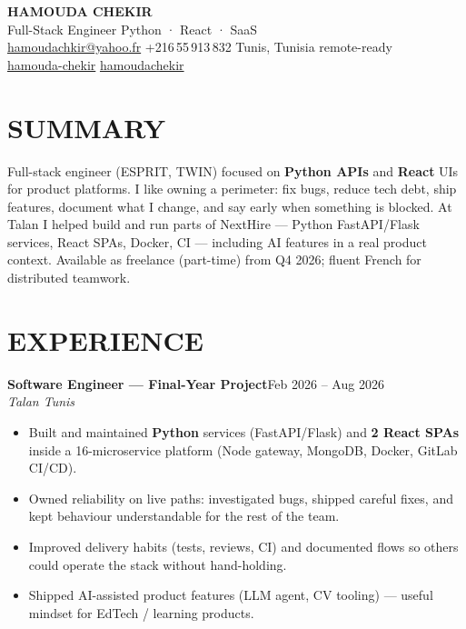 \documentclass[10pt,a4paper]{article}
\newcommand{\TargetTitle}{Full-Stack Engineer \textbar{} Python · React · SaaS}
\newcommand{\job}[3]{%
  \textbf{\color{primary}#1}\hfill{\color{muted}\small #2}\\[-1pt]
  {\color{accent}\textit{#3}}\\[2pt]
  \begin{itemize}[leftmargin=0.85em, itemsep=1pt, topsep=0pt, parsep=0pt, partopsep=0pt]
}
\newcommand{\contactsep}{\hspace{5pt}{\color{rulecolor}|}\hspace{5pt}}
\begin{document}
{\fontsize{22}{26}\selectfont\bfseries\color{primary}HAMOUDA CHEKIR}\\[2pt]
{\large\color{accent}\TargetTitle}\\[4pt]
{\footnotesize\color{muted}%
  \hspace{3pt}\href{mailto:hamoudachkir@yahoo.fr}{hamoudachkir@yahoo.fr}%
  \contactsep
  \hspace{3pt}+216\,55\,913\,832%
  \contactsep
  \hspace{3pt}Tunis, Tunisia \textbar{} remote-ready%
}\\[2pt]
{\footnotesize\color{muted}%
  \hspace{3pt}\href{https://www.linkedin.com/in/hamouda-chekir-5053572b4}{hamouda-chekir}%
  \contactsep
  \hspace{3pt}\href{https://github.com/hamoudachekir}{hamoudachekir}%
}\\[6pt]

\section{SUMMARY}
Full-stack engineer (ESPRIT, TWIN) focused on \textbf{Python APIs} and \textbf{React} UIs for product platforms.
I like owning a perimeter: fix bugs, reduce tech debt, ship features, document what I change, and say early when something is blocked.
At Talan I helped build and run parts of NextHire --- Python FastAPI/Flask services, React SPAs, Docker, CI --- including AI features in a real product context.
Available as freelance (part-time) from Q4 2026; fluent French for distributed teamwork.

\section{EXPERIENCE}

\job{Software Engineer --- Final-Year Project}{Feb 2026 -- Aug 2026}{Talan \textbar{} Tunis}
  \item Built and maintained \textbf{Python} services (FastAPI/Flask) and \textbf{2 React SPAs} inside a 16-microservice platform (Node gateway, MongoDB, Docker, GitLab CI/CD).
  \item Owned reliability on live paths: investigated bugs, shipped careful fixes, and kept behaviour understandable for the rest of the team.
  \item Improved delivery habits (tests, reviews, CI) and documented flows so others could operate the stack without hand-holding.
  \item Shipped AI-assisted product features (LLM agent, CV tooling) --- useful mindset for EdTech / learning products.
\end{itemize}
\end{document}
